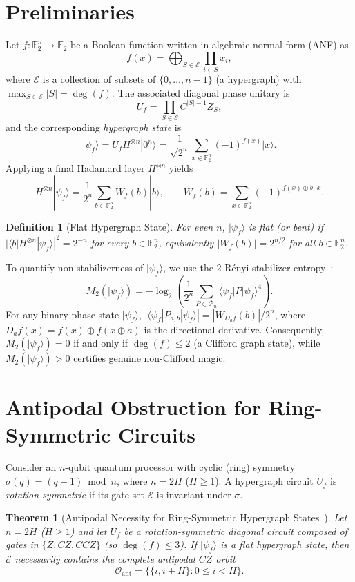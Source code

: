 \documentclass[11pt,a4paper]{article}
\newtheorem{theorem}{Theorem}
\newtheorem{definition}{Definition}
\newcommand{\F}{\mathbb{F}}
\newcommand{\ket}[1]{|#1\rangle}
\newcommand{\bra}[1]{\langle#1|}
\begin{document}
\section{Preliminaries}
Let $f:\F_2^n\to\F_2$ be a Boolean function written in algebraic normal form (ANF) as
\[
  f(x) = \bigoplus_{S \in \mathcal{E}} \prod_{i \in S} x_i,
\]
where $\mathcal{E}$ is a collection of subsets of $\{0, \dots, n-1\}$ (a hypergraph) with $\max_{S \in \mathcal{E}} |S| = \deg(f)$. The associated diagonal phase unitary is
\[
  U_f = \prod_{S \in \mathcal{E}} C^{|S|-1}Z_S,
\]
and the corresponding \emph{hypergraph state} is
\[
  \ket{\psi_f} = U_f H^{\otimes n}\ket{0^n} = \frac{1}{\sqrt{2^n}} \sum_{x \in \F_2^n} (-1)^{f(x)}\ket{x}.
\]
Applying a final Hadamard layer $H^{\otimes n}$ yields
\[
  H^{\otimes n}\ket{\psi_f} = \frac{1}{2^n}\sum_{b \in \F_2^n} W_f(b)\ket{b},
  \qquad
  W_f(b) = \sum_{x \in \F_2^n} (-1)^{f(x) \oplus b\cdot x}.
\]

\begin{definition}[Flat Hypergraph State]
For even $n$, $\ket{\psi_f}$ is \emph{flat} (or \emph{bent}) if $|\bra{b}H^{\otimes n}\ket{\psi_f}|^2 = 2^{-n}$ for every $b \in \F_2^n$, equivalently $|W_f(b)| = 2^{n/2}$ for all $b \in \F_2^n$.
\end{definition}

To quantify non-stabilizerness of $\ket{\psi_f}$, we use the $2$-R\'enyi stabilizer entropy~\cite{Leone2022}:
\[
  M_2(\ket{\psi_f}) = -\log_2\!\left(\frac{1}{2^n}\sum_{P \in \mathcal{P}_n} \bra{\psi_f}P\ket{\psi_f}^4\right).
\]
For any binary phase state $\ket{\psi_f}$, $|\bra{\psi_f}P_{a,b}\ket{\psi_f}| = |W_{D_a f}(b)| / 2^n$, where $D_a f(x) = f(x)\oplus f(x\oplus a)$ is the directional derivative. Consequently, $M_2(\ket{\psi_f}) = 0$ if and only if $\deg(f) \le 2$ (a Clifford graph state), while $M_2(\ket{\psi_f}) > 0$ certifies genuine non-Clifford magic.

\section{Antipodal Obstruction for Ring-Symmetric Circuits}
\label{sec:antipodal}

Consider an $n$-qubit quantum processor with cyclic (ring) symmetry $\sigma(q) = (q+1) \bmod n$, where $n = 2H$ ($H \ge 1$). A hypergraph circuit $U_f$ is \emph{rotation-symmetric} if its gate set $\mathcal{E}$ is invariant under $\sigma$.

\begin{theorem}[Antipodal Necessity for Ring-Symmetric Hypergraph States~\cite{Vono2026Antipodal}]
\label{thm:antipodal}
Let $n = 2H$ ($H \ge 1$) and let $U_f$ be a rotation-symmetric diagonal circuit composed of gates in $\{Z, CZ, CCZ\}$ (so $\deg(f) \le 3$). If $\ket{\psi_f}$ is a flat hypergraph state, then $\mathcal{E}$ necessarily contains the complete antipodal $CZ$ orbit
\[
  \mathcal{O}_{\mathrm{ant}} = \bigl\{\{i, i+H\} : 0 \le i < H\bigr\}.
\]
\end{theorem}
\end{document}
